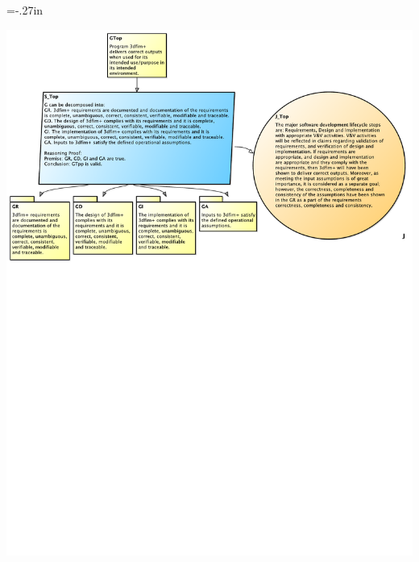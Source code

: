 \documentclass[t,12pt,numbers,fleqn]{beamer}
\begin{document}
\hoffset=-.27in
\begin{frame}[plain]

\includegraphics[width=1.15\textwidth]{../Figures/TopGoal.pdf}

\end{frame}
\hoffset=0in

\end{document}
